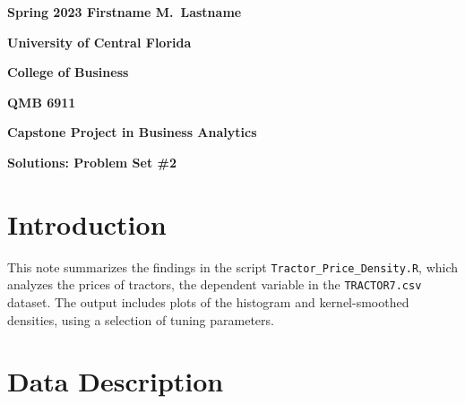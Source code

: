 \documentclass[11pt]{book}
\begin{document}

\pagestyle{empty}
{\noindent\bf Spring 2023 \hfill Firstname M.~Lastname}
\vskip 16pt
\centerline{\bf University of Central Florida}
\centerline{\bf College of Business}
\vskip 16pt
\centerline{\bf QMB 6911}
\centerline{\bf Capstone Project in Business Analytics}
\vskip 10pt
\centerline{\bf Solutions:  Problem Set \#2}
\vskip 32pt
\noindent

\section{Introduction}

This note summarizes the findings in the script
\texttt{Tractor\_Price\_Density.R},
which analyzes the prices of tractors,
the dependent variable in the \texttt{TRACTOR7.csv} dataset.
The output includes plots of the histogram
and kernel-smoothed densities,
using a selection of tuning parameters.

\section{Data Description}
\end{document}
